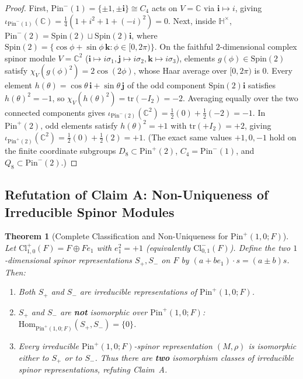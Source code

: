 \documentclass[11pt,a4paper]{article}
\theoremstyle{plain}
\newtheorem{theorem}{Theorem}[section]
\theoremstyle{definition}
\newcommand{\Cl}{\mathrm{Cl}}
\newcommand{\Pin}{\mathrm{Pin}}
\newcommand{\Spin}{\mathrm{Spin}}
\newcommand{\Hom}{\mathrm{Hom}}
\newcommand{\C}{\mathbb{C}}
\newcommand{\HH}{\mathbb{H}}
\newcommand{\tr}{\mathrm{tr}}
\begin{document}
\begin{proof}
First, $\Pin^-(1) = \{\pm 1, \pm \mathbf{i}\} \cong C_4$ acts on $V = \C$ via $\mathbf{i} \mapsto i$, giving $\iota_{\Pin^-(1)}(\C) = \frac{1}{4}(1 + i^2 + 1 + (-i)^2) = 0$. Next, inside $\HH^\times$, $\Pin^-(2) = \Spin(2) \sqcup \Spin(2)\mathbf{i}$, where $\Spin(2) = \{\cos\phi + \sin\phi\,\mathbf{k} : \phi \in [0,2\pi)\}$. On the faithful $2$-dimensional complex spinor module $V = \C^2$ ($\mathbf{i} \mapsto i\sigma_1, \mathbf{j} \mapsto i\sigma_2, \mathbf{k} \mapsto i\sigma_3$), elements $g(\phi) \in \Spin(2)$ satisfy $\chi_V(g(\phi)^2) = 2\cos(2\phi)$, whose Haar average over $[0,2\pi)$ is $0$. Every element $h(\theta) = \cos\theta\,\mathbf{i} + \sin\theta\,\mathbf{j}$ of the odd component $\Spin(2)\mathbf{i}$ satisfies $h(\theta)^2 = -1$, so $\chi_V(h(\theta)^2) = \tr(-I_2) = -2$. Averaging equally over the two connected components gives $\iota_{\Pin^-(2)}(\C^2) = \frac{1}{2}(0) + \frac{1}{2}(-2) = -1$. In $\Pin^+(2)$, odd elements satisfy $h(\theta)^2 = +1$ with $\tr(+I_2) = +2$, giving $\iota_{\Pin^+(2)}(\C^2) = \frac{1}{2}(0) + \frac{1}{2}(2) = +1$. (The exact same values $+1, 0, -1$ hold on the finite coordinate subgroups $D_8 \subset \Pin^+(2)$, $C_4 = \Pin^-(1)$, and $Q_8 \subset \Pin^-(2)$.)
\end{proof}

\subsection{Refutation of Claim A: Non-Uniqueness of Irreducible Spinor Modules}

\begin{theorem}[Complete Classification and Non-Uniqueness for $\Pin^+(1,0; F)$]
\label{thm:pin10-nonunique}
Let $\Cl_{1,0}^+(F) = F \oplus F e_1$ with $e_1^2 = +1$ (equivalently $\Cl_{0,1}^-(F)$). Define the two $1$-dimensional spinor representations $S_+, S_-$ on $F$ by $(a + b e_1)\cdot s = (a \pm b)s$. Then:
\begin{enumerate}
\item[(i)] Both $S_+$ and $S_-$ are irreducible representations of $\Pin^+(1,0; F)$.
\item[(ii)] $S_+$ and $S_-$ are \textbf{not} isomorphic over $\Pin^+(1,0; F)$: $\Hom_{\Pin^+(1,0; F)}(S_+, S_-) = \{0\}$.
\item[(iii)] Every irreducible $\Pin^+(1,0; F)$-spinor representation $(M, \rho)$ is isomorphic either to $S_+$ or to $S_-$. Thus there are \textbf{two} isomorphism classes of irreducible spinor representations, refuting Claim~A.
\end{enumerate}
\end{theorem}
\end{document}
